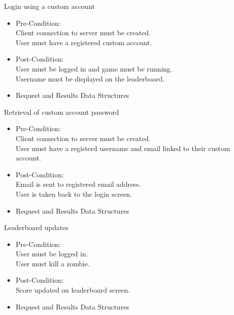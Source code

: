 \documentclass[letterpaper]{article}
\begin{document}
				\vspace{0.1in}Login using a custom account
					\begin{itemize}
						\item Pre-Condition: \\
							Client connection to server must be created. \\				
							User must have a registered custom account. \\
						\item Post-Condition: \\
							User must be logged in and game must be running. \\
							Username must be displayed on the leaderboard. \\			
						\item Request and Results Data Structures \\
						
					\end{itemize}

				\vspace{0.1in}Retrieval of custom account password
					\begin{itemize}
						\item Pre-Condition: \\
							Client connection to server must be created. \\
							User must have a registerd username and email linked to their custom account. \\ 
						\item Post-Condition: \\
							Email is sent to registered email address. \\
							User is taken back to the login screen. \\
						\item Request and Results Data Structures \\
						
					\end{itemize}
									
				\vspace{0.1in}Leaderboard updates
					\begin{itemize}
						\item Pre-Condition: \\
							User must be logged in. \\ 
							User must kill a zombie. \\
						\item Post-Condition: \\
							Score updated on leaderboard screen. \\						
						\item Request and Results Data Structures \\
						
					\end{itemize}					
														
\end{document}
